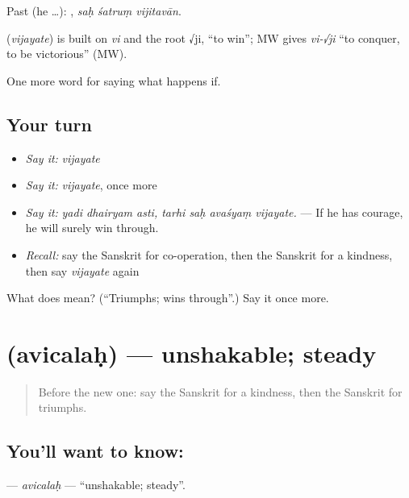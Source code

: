Past (he …):   , \emph{saḥ śatruṃ vijitavān}.

\begin{cousinweb}
\textbf{} (\emph{vijayate}) is built on \emph{vi} and the root √ji, \textquotedblleft{}to win\textquotedblright{}; MW gives \emph{vi-√ji} \textquotedblleft{}to conquer, to be victorious\textquotedblright{} (MW).
\end{cousinweb}

\begin{grammarlens}[title={What you've built}]
One more word for saying what happens if.
\end{grammarlens}

\subsection*{Your turn}
\begin{itemize}
\raggedright
  \item \emph{Say it:} \emph{vijayate}
  \item \emph{Say it:} \emph{vijayate}, once more
  \item \emph{Say it:} \emph{yadi dhairyam asti, tarhi saḥ avaśyaṃ vijayate.} — If he has courage, he will surely win through.
  \item \emph{Recall:} say the Sanskrit for co-operation, then the Sanskrit for a kindness, then say \emph{vijayate} again
\end{itemize}

\begin{tcolorbox}[breakable,colback=teal!4,colframe=teal!35!black,title={Before you move on}]
What does  mean? (\textquotedblleft{}Triumphs; wins through\textquotedblright{}.) Say it once more.
\end{tcolorbox}
\section[\texorpdfstring{\sk{अविचलः} (avicalaḥ)}{अविचलः (avicalaḥ)}]{ (avicalaḥ) — unshakable; steady}

\label{lesson:SA-C393-avicalah}



\begin{quote}
Before the new one: say the Sanskrit for a kindness, then the Sanskrit for triumphs.
\end{quote}

\subsection*{You'll want to know: }
\textbf{} — \emph{avicalaḥ} — \textquotedblleft{}unshakable; steady\textquotedblright{}.

